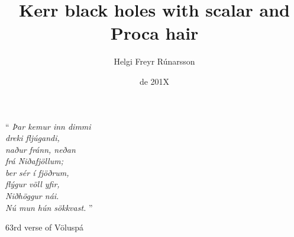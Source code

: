 \documentclass[11pt,a4paper,twoside,openright]{book}
\title{Kerr black holes with scalar and Proca hair
}
\author{Helgi Freyr Rúnarsson}
\date{de 201X}
\let\origdoublepage\cleardoublepage
\newcommand{\clearemptydoublepage}{%
  \clearpage
  {\pagestyle{empty}\origdoublepage}%
}
\let\cleardoublepage\clearemptydoublepage
\begin{document}
\pagestyle{plain}

\coverp
\titlep
\dedication
\jury



\cleardoublepage

\cleardoublepage
\tableofcontents
\cleardoublepage
\listoffigures
\cleardoublepage


\pagestyle{headings}












\cleardoublepage
\newpage
\thispagestyle{empty}
\epigraph{``\emph{
Þar kemur inn dimmi \\
dreki fljúgandi, \\
naður fránn, neðan \\
frá Niðafjöllum; \\
ber sér í fjöðrum, \\
flýgur völl yfir, \\
Niðhöggur nái. \\
Nú mun hún sökkvast. 
} 
''}{63rd verse of Völuspá}
\cleardoublepage


\appendix







\cleardoublepage
{}
{}


\end{document}
